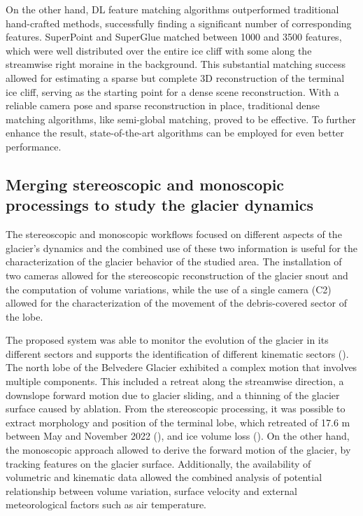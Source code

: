 On the other hand, DL feature matching algorithms outperformed traditional hand-crafted
methods, successfully finding a significant number of corresponding features.
SuperPoint and SuperGlue matched between 1000 and 3500 features, which were
well distributed over the entire ice cliff with some along the streamwise right moraine
in the background.
This substantial matching success allowed for estimating a sparse but complete 3D
reconstruction of the terminal ice cliff, serving as the starting point for a
dense scene reconstruction.
With a reliable camera pose and sparse reconstruction in place, traditional dense
matching algorithms, like semi-global matching, proved to be effective.
To further enhance the result, state-of-the-art algorithms can be employed for
even better performance.

\subsection{Merging stereoscopic and monoscopic processings to study the glacier
  dynamics}\label{sec:4:stereo_monoscopic}

The stereoscopic and monoscopic workflows focused on different aspects of the glacier's
dynamics and the combined use of these two information is useful for the characterization
of the glacier behavior of the studied area.
The installation of two cameras allowed for the stereoscopic reconstruction of the
glacier snout and the computation of volume variations, while the use of a single camera
(C2) allowed for the characterization of the movement of the debris-covered sector of the
lobe.

The proposed system was able to monitor the evolution of the glacier in its different
sectors and supports the identification of different kinematic sectors
().
The north lobe of the Belvedere Glacier exhibited a complex motion that involves multiple
components.
This included a retreat along the streamwise direction, a downslope forward motion due to
glacier sliding, and a thinning of the glacier surface caused by ablation.
From the stereoscopic processing, it was possible to extract morphology and position of
the terminal lobe, which retreated of 17.6 m between May and November 2022
(), and ice volume loss ().
On the other hand, the monoscopic approach allowed to derive the forward motion of the
glacier, by tracking features on the glacier surface.
Additionally, the availability of volumetric and kinematic data allowed
the combined analysis of potential relationship between volume variation, surface
velocity and external meteorological factors such as air temperature.

